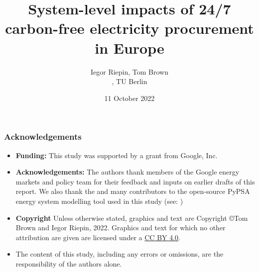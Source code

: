 


\title{System-level impacts of 24/7 carbon-free electricity procurement in Europe}

\author{
  Iegor Riepin, Tom Brown\\
  , TU Berlin
}

\date{11 October 2022}




\maketitle


\begin{frame}
  \frametitle{Acknowledgements}

  \begin{itemize}
    \item {\bf Funding:} This study was supported by a grant from Google, Inc. 
    \item {\bf Acknowledgements:} The authors thank members of the Google energy markets and policy team 
    for their feedback and inputs on earlier drafts of this report. 
    We also thank the  and many contributors to the open-source 
    PyPSA energy system modelling tool used in this study (see: )
    \item 
    {\bf Copyright} Unless otherwise stated, graphics and text are Copyright \copyright Tom Brown and Iegor Riepin, 2022.
    Graphics and text for which no other attribution are given are licensed under a 
    \href{https://creativecommons.org/licenses/by/4.0/}{CC BY 4.0}.  {\footnotesize \ccby} 
    \item The content of this study, including any errors or omissions, are the responsibility
    of the authors alone.
  \end{itemize}

\end{frame}


